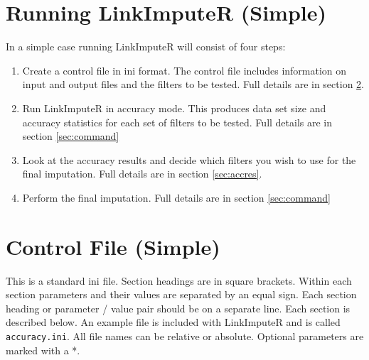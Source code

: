 \documentclass[10pt]{report}
\begin{document}
\section{Running LinkImputeR (Simple)}
In a simple case running LinkImputeR will consist of four steps:
\begin{enumerate}
\item Create a control file in ini format.  The control file includes information on input and output files and the filters to be tested.  Full details are in section \ref{sec:ini}.
\item Run LinkImputeR in accuracy mode.  This produces data set size and accuracy statistics for each set of filters to be tested.  Full details are in section \ref{sec:command}
\item Look at the accuracy results and decide which filters you wish to use for the final imputation.  Full details are in section \ref{sec:accres}.
\item Perform the final imputation.  Full details are in section \ref{sec:command}
\end{enumerate}

\section{Control File (Simple)}
\label{sec:ini}
This is a standard ini file.  Section headings are in square brackets.  Within each section parameters and their values are separated by an equal sign.  Each section heading or parameter / value pair should be on a separate line.  Each section is described below.  An example file is included with LinkImputeR and is called \texttt{accuracy.ini}.  All file names can be relative or absolute.  Optional parameters are marked with a *.
\end{document}
